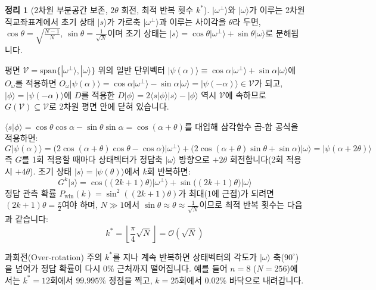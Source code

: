 \documentclass[11pt, a4paper]{article}
\newcommand{\ket}[1]{|#1\rangle}
\newcommand{\braket}[2]{\langle#1|#2\rangle}
\theoremstyle{definition}
\newtheorem{theorem}{정리}[section]
\begin{document}
\begin{theorem}[2차원 부분공간 보존, $2\theta$ 회전, 최적 반복 횟수 $k^*$]
$\ket{\omega^\perp}$와 $\ket{\omega}$가 이루는 2차원 직교좌표계에서 초기 상태 $\ket{s}$가 가로축 $\ket{\omega^\perp}$과 이루는 사이각을 $\theta$라 두면, $\cos\theta = \sqrt{\frac{N-1}{N}}$, $\sin\theta = \frac{1}{\sqrt{N}}$이며 초기 상태는 $\ket{s} = \cos\theta\ket{\omega^\perp} + \sin\theta\ket{\omega}$로 분해됩니다.

평면 $\mathcal{V} = \mathrm{span}\{\ket{\omega^\perp}, \ket{\omega}\}$ 위의 일반 단위벡터 $\ket{\psi(\alpha)} \equiv \cos\alpha\ket{\omega^\perp} + \sin\alpha\ket{\omega}$에 $O_\omega$를 적용하면 $O_\omega\ket{\psi(\alpha)} = \cos\alpha\ket{\omega^\perp} - \sin\alpha\ket{\omega} = \ket{\psi(-\alpha)} \in \mathcal{V}$가 되고, $\ket{\phi} = \ket{\psi(-\alpha)}$에 $D$를 적용한 $D\ket{\phi} = 2\braket{s}{\phi}\ket{s} - \ket{\phi}$ 역시 $\mathcal{V}$에 속하므로 $G(\mathcal{V}) \subseteq \mathcal{V}$로 2차원 평면 안에 닫혀 있습니다.

$\braket{s}{\phi} = \cos\theta\cos\alpha - \sin\theta\sin\alpha = \cos(\alpha+\theta)$를 대입해 삼각함수 곱-합 공식을 적용하면:
$$G\ket{\psi(\alpha)} = \big(2\cos(\alpha+\theta)\cos\theta - \cos\alpha\big)\ket{\omega^\perp} + \big(2\cos(\alpha+\theta)\sin\theta + \sin\alpha\big)\ket{\omega} = \ket{\psi(\alpha + 2\theta)}$$
즉 $G$를 1회 적용할 때마다 상태벡터가 정답축 $\ket{\omega}$ 방향으로 $+2\theta$ 회전합니다(2회 적용 시 $+4\theta$). 초기 상태 $\ket{s} = \ket{\psi(\theta)}$에서 $k$회 반복하면:
$$G^k\ket{s} = \cos\big((2k+1)\theta\big)\ket{\omega^\perp} + \sin\big((2k+1)\theta\big)\ket{\omega}$$
정답 관측 확률 $P_{\text{win}}(k) = \sin^2((2k+1)\theta)$가 최대($1$에 근접)가 되려면 $(2k+1)\theta = \frac{\pi}{2}$여야 하며, $N \gg 1$에서 $\sin\theta \approx \theta \approx \frac{1}{\sqrt{N}}$이므로 최적 반복 횟수는 다음과 같습니다:
$$k^* = \left\lfloor \frac{\pi}{4}\sqrt{N} \right\rfloor = \mathcal{O}\left(\sqrt{N}\right)$$
\end{theorem}

\begin{cautionbox}{과회전(Over-rotation) 주의}
$k^*$를 지나 계속 반복하면 상태벡터의 각도가 $\ket{\omega}$ 축($90^\circ$)을 넘어가 정답 확률이 다시 $0\%$ 근처까지 떨어집니다. 예를 들어 $n=8$ ($N=256$)에서는 $k^*=12$회에서 $99.995\%$ 정점을 찍고, $k=25$회에서 $0.02\%$ 바닥으로 내려갑니다.
\end{cautionbox}

\end{document}

